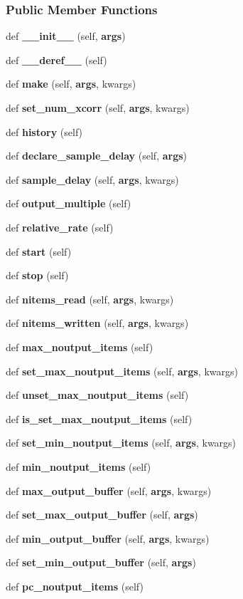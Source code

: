 \subsubsection*{Public Member Functions}
\begin{DoxyCompactItemize}
\item 
def {\bf \+\_\+\+\_\+init\+\_\+\+\_\+} (self, {\bf args})
\item 
def {\bf \+\_\+\+\_\+deref\+\_\+\+\_\+} (self)
\item 
def {\bf make} (self, {\bf args}, kwargs)
\item 
def {\bf set\+\_\+num\+\_\+xcorr} (self, {\bf args}, kwargs)
\item 
def {\bf history} (self)
\item 
def {\bf declare\+\_\+sample\+\_\+delay} (self, {\bf args})
\item 
def {\bf sample\+\_\+delay} (self, {\bf args}, kwargs)
\item 
def {\bf output\+\_\+multiple} (self)
\item 
def {\bf relative\+\_\+rate} (self)
\item 
def {\bf start} (self)
\item 
def {\bf stop} (self)
\item 
def {\bf nitems\+\_\+read} (self, {\bf args}, kwargs)
\item 
def {\bf nitems\+\_\+written} (self, {\bf args}, kwargs)
\item 
def {\bf max\+\_\+noutput\+\_\+items} (self)
\item 
def {\bf set\+\_\+max\+\_\+noutput\+\_\+items} (self, {\bf args}, kwargs)
\item 
def {\bf unset\+\_\+max\+\_\+noutput\+\_\+items} (self)
\item 
def {\bf is\+\_\+set\+\_\+max\+\_\+noutput\+\_\+items} (self)
\item 
def {\bf set\+\_\+min\+\_\+noutput\+\_\+items} (self, {\bf args}, kwargs)
\item 
def {\bf min\+\_\+noutput\+\_\+items} (self)
\item 
def {\bf max\+\_\+output\+\_\+buffer} (self, {\bf args}, kwargs)
\item 
def {\bf set\+\_\+max\+\_\+output\+\_\+buffer} (self, {\bf args})
\item 
def {\bf min\+\_\+output\+\_\+buffer} (self, {\bf args}, kwargs)
\item 
def {\bf set\+\_\+min\+\_\+output\+\_\+buffer} (self, {\bf args})
\item 
def {\bf pc\+\_\+noutput\+\_\+items} (self)

\end{DoxyCompactItemize}
